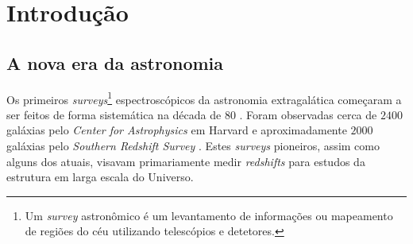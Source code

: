 


\chapter{Introdução}
\label{sec:Intro}


\section{A nova era da astronomia}
\label{sec:Intro:NovaEra}

Os primeiros {\em surveys}\footnote{Um {\em survey} astronômico é um
levantamento de informações ou mapeamento de regiões do céu utilizando
telescópios e detetores.} espectroscópicos da astronomia extragalática começaram
a ser feitos de forma sistemática na década de 80 \citep{Huchra1988}. Foram
observadas cerca de $2400$ galáxias pelo {\em Center for Astrophysics} em
Harvard \citep{Huchra1983} e aproximadamente $2000$ galáxias pelo {\em Southern
Redshift Survey} \citep{DaCosta1988}. Estes {\em surveys} pioneiros, assim como
alguns dos atuais, visavam primariamente medir {\em redshifts} para estudos da
estrutura em larga escala do Universo.

